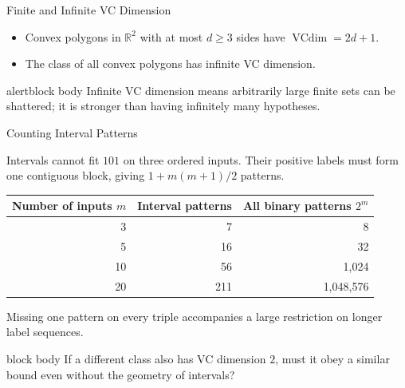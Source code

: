 \documentclass[aspectratio=169,10pt]{beamer}
\newcommand{\vcdim}{\operatorname{VCdim}}
\newcommand{\KeyBox}[1]{%
  \begin{beamercolorbox}[rounded=true,sep=0.22cm,wd=\linewidth]{block body}
    #1
  \end{beamercolorbox}%
}
\newcommand{\OrangeBox}[1]{%
  \begin{beamercolorbox}[rounded=true,sep=0.22cm,wd=\linewidth]{alertblock body}
    #1
  \end{beamercolorbox}%
}
\begin{document}
\begin{frame}[t]{Finite and Infinite VC Dimension}
  \vspace{0.01cm}
  \begin{itemize}
    \setlength{\itemsep}{0.10cm}
    \item Convex polygons in $\mathbb{R}^2$ with at most $d\ge3$ sides have $\vcdim=2d+1$.
    \item The class of all convex polygons has infinite VC dimension.
  \end{itemize}
  \begin{center}
  \end{center}
  \vspace{0.02cm}
  \OrangeBox{Infinite VC dimension means arbitrarily large finite sets can be shattered; it is stronger than having infinitely many hypotheses.}
\end{frame}



\begin{frame}[t]{Counting Interval Patterns}
  \vspace{0.04cm}
  \small

  Intervals cannot fit $101$ on three ordered inputs. Their positive labels
  must form one contiguous block, giving $1+m(m+1)/2$ patterns.
  \begin{center}
  \renewcommand{\arraystretch}{1.15}
  \begin{tabular}{r r r}
    \toprule
    Number of inputs $m$ & Interval patterns & All binary patterns $2^m$\\
    \midrule
    3 & 7 & 8\\
    5 & 16 & 32\\
    10 & 56 & 1,024\\
    20 & 211 & 1,048,576\\
    \bottomrule
  \end{tabular}
  \end{center}
  Missing one pattern on every triple accompanies a large restriction on
  longer label sequences.
  \vspace{0.15cm}
  \KeyBox{If a different class also has VC dimension $2$, must it obey a
  similar bound even without the geometry of intervals?}

\end{frame}
\end{document}
